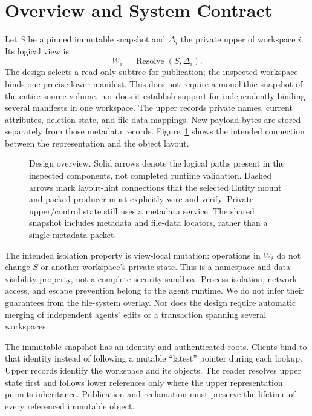 \section{Overview and System Contract}
\label{sec:overview}

Let $S$ be a pinned immutable snapshot and $\Delta_i$ the private upper of
workspace $i$. Its logical view is
\begin{equation}
  W_i = \operatorname{Resolve}(S,\Delta_i).
\end{equation}
The design selects a read-only subtree for publication; the inspected
workspace binds one precise lower manifest. This does not require a
monolithic snapshot of the entire source volume, nor does it establish
support for independently binding several manifests in one workspace.
The upper records private names, current attributes, deletion state, and
file-data mappings. New payload bytes are stored separately from those
metadata records. Figure~\ref{fig:overview} shows the intended connection
between the representation and the object layout.

\begin{figure}[t]
\centering

\caption{Design overview. Solid arrows denote the logical paths present in
the inspected components, not completed runtime validation. Dashed arrows
mark layout-hint connections that the selected Entity mount and packed
producer must explicitly wire and verify. Private upper/control state still
uses a metadata service. The shared snapshot includes metadata and file-data
locators, rather than a single metadata packet.}
\label{fig:overview}
\end{figure}

The intended isolation property is view-local mutation: operations in
$W_i$ do not change $S$ or another workspace's private state. This is a
namespace and data-visibility property, not a complete security sandbox.
Process isolation, network access, and escape prevention belong to the agent
runtime. We do not infer their guarantees from the file-system overlay.
Nor does the design require automatic merging of independent agents' edits
or a transaction spanning several workspaces.

The immutable snapshot has an identity and authenticated roots. Clients bind
to that identity instead of following a mutable ``latest'' pointer during
each lookup. Upper records identify the workspace and its objects. The
reader resolves upper state first and follows lower references only where
the upper representation permits inheritance. Publication and reclamation
must preserve the lifetime of every referenced immutable object.


